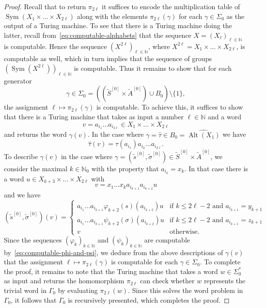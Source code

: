 \documentclass[a4paper]{amsart}
\renewcommand\leq\leqslant
\numberwithin{equation}{section}
\theoremstyle{definition}
\theoremstyle{remark}
\newcommand{\N}{\mathbb{N}}
\DeclareMathOperator{\Alt}{Alt}
\DeclareMathOperator{\Sym}{Sym}
\begin{document}
\begin{proof}
Recall that to return $\pi_{2 \ell}$ it suffices to encode the multiplication table of $\Sym(X_1 \times \ldots \times X_{2\ell})$ along with the elements $\pi_{2 \ell}(\gamma)$ for each $\gamma \in \Sigma_{0}$ as the output of a Turing machine.
To see that there is a Turing machine doing the latter, recall from~\eqref{eq:computable-alphabets} that the sequence $X = (X_{\ell})_{\ell \in \N}$ is computable.
Hence the sequence $(X^{2\ell})_{\ell \in \N}$, where $X^{2\ell} = X_1 \times \ldots \times X_{2\ell}$, is computable as well, which in turn implies that the sequence of groups $(\Sym(X^{2\ell}))_{\ell \in \N}$ is computable.
Thus it remains to show that for each generator
\[
\gamma \in \Sigma_0 = ((\widetilde{S}^{[0]} \times \widetilde{A}^{[0]}) \cup B_{0}) \setminus \{1\},
\]
the assignment $\ell \mapsto \pi_{2\ell}(\gamma)$ is computable.
To achieve this, it suffices to show that there is a Turing machine that takes as input a number $\ell \in \N$ and a word
\[
v = a_{i_1} \ldots a_{i_{2\ell}} \in X_1 \times \ldots \times X_{2\ell}
\]
and returns the word $\gamma(v)$.
In the case where $\gamma = \widehat{\tau} \in B_{0} = \widehat{\Alt(X_{1})}$
we have
\[
\widehat{\tau}(v) = \tau(a_{i_1}) a_{i_2} \ldots a_{i_{2\ell}}.
\]
To describe $\gamma(v)$ in the case where $\gamma = (\widetilde{s}^{[0]},\widetilde{\sigma}^{[0]}) \in \widetilde{S}^{[0]} \times \widetilde{A}^{[0]}$, we consider the maximal $k \in \N_0$ with the property that $a_{i_k} = x_k$.
In that case there is a word $u \in X_{k+3} \times \ldots \times X_{2\ell}$ with
\[
v = x_1 \ldots x_{k} a_{i_{k+1}} a_{i_{k+2}} u
\]
and we have
\[
(\widetilde{s}^{[0]},\widetilde{\sigma}^{[0]})(v) =
\begin{cases}
a_{i_{1}} \ldots a_{i_{k+1}} \varphi_{k+2}(s)(a_{i_{k+2}}) u &\text{if } k \leq 2\ell-2 \text{ and } a_{i_{k+1}} = y_{k+1}\\
a_{i_{1}} \ldots a_{i_{k+1}} \psi_{k+2}(\sigma)(a_{i_{k+2}}) u &\text{if } k \leq 2\ell-2 \text{ and } a_{i_{k+1}} = z_{k+1} \\
v &\text{otherwise.}
\end{cases}
\]
Since the sequences $(\varphi_k)_{k \in \N}$ and $(\psi_k)_{k \in \N}$ are computable by~\eqref{eq:computable-phi-and-psi}, we deduce from the above descriptions of $\gamma(v)$ that the assignment $\ell \mapsto \pi_{2\ell}(\gamma)$ is computable for each $\gamma \in \Sigma_0$.
To complete the proof, it remains to note that the Turing machine that takes a word $w \in \Sigma_{0}^{\ast}$ as input and returns the homomorphism $\pi_{2 \ell}$ can check whether $w$ represents the trivial word in $\Gamma_0$ by evaluating $\pi_{2 \ell}(w)$.
Since this solves the word problem in $\Gamma_0$, it follows that $\Gamma_0$ is recursively presented, which completes the proof.
\end{proof}
\end{document}

